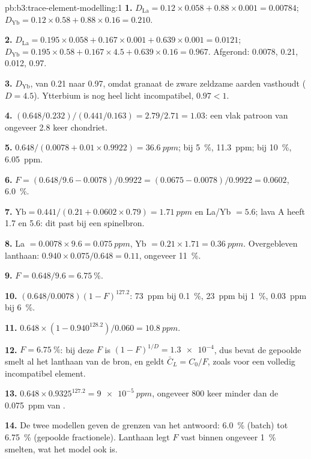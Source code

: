 \begin{solution}{pb:b3:trace-element-modelling:1}
\textbf{1.} $D_{\mathrm{La}} = 0.12\times0.058 + 0.88\times0.001 = 0.00784$;
$D_{\mathrm{Yb}} = 0.12\times0.58 + 0.88\times0.16 = 0.210$.

\textbf{2.} $D_{\mathrm{La}} = 0.195\times0.058 + 0.167\times0.001 +
0.639\times0.001 = 0.0121$; $D_{\mathrm{Yb}} = 0.195\times0.58 +
0.167\times4.5 + 0.639\times0.16 = 0.967$. Afgerond: 0.0078, 0.21, 0.012, 0.97.

\textbf{3.} $D_{\mathrm{Yb}}$, van 0.21 naar 0.97, omdat granaat de zware
zeldzame aarden vasthoudt ($D = 4.5$). Ytterbium is nog heel licht incompatibel,
$0.97 < 1$.

\textbf{4.} $(0.648/0.232)/(0.441/0.163) = 2.79/2.71 = 1.03$: een vlak patroon
van ongeveer 2.8 keer chondriet.

\textbf{5.} $0.648/(0.0078 + 0.01\times0.9922) = \qty{36.6}{ppm}$; bij
\qty{5}{\percent}, \qty{11.3}{ppm}; bij \qty{10}{\percent}, \qty{6.05}{ppm}.

\textbf{6.} $F = (0.648/9.6 - 0.0078)/0.9922 = (0.0675 - 0.0078)/0.9922 =
0.0602$, \qty{6.0}{\percent}.

\textbf{7.} $\mathrm{Yb} = 0.441/(0.21 + 0.0602\times0.79) = \qty{1.71}{ppm}$
en La/Yb $= 5.6$; lava A heeft 1.7 en 5.6: dit past bij een spinelbron.

\textbf{8.} La $= 0.0078\times9.6 = \qty{0.075}{ppm}$, Yb $= 0.21\times1.71 =
\qty{0.36}{ppm}$. Overgebleven lanthaan: $0.940\times0.075/0.648 = 0.11$, ongeveer
\qty{11}{\percent}.

\textbf{9.} $F = 0.648/9.6 = \qty{6.75}{\percent}$.

\textbf{10.} $(0.648/0.0078)(1 - F)^{127.2}$: \qty{73}{ppm} bij
\qty{0.1}{\percent}, \qty{23}{ppm} bij \qty{1}{\percent}, \qty{0.03}{ppm} bij
\qty{6}{\percent}.

\textbf{11.} $0.648\times(1 - 0.940^{128.2})/0.060 = \qty{10.8}{ppm}$.

\textbf{12.} $F = \qty{6.75}{\percent}$: bij deze $F$ is $(1 - F)^{1/D} =
\num{1.3e-4}$, dus bevat de gepoolde smelt al het lanthaan van de bron, en
geldt $\bar C_L = C_0/F$, zoals voor een volledig incompatibel element.

\textbf{13.} $0.648\times0.9325^{127.2} = \qty{9e-5}{ppm}$, ongeveer 800 keer
minder dan de \qty{0.075}{ppm} van .

\textbf{14.} De twee modellen geven de grenzen van het antwoord: \qty{6.0}{\percent} (batch)
tot \qty{6.75}{\percent} (gepoolde fractionele). Lanthaan legt $F$ vast binnen
ongeveer \qty{1}{\percent} smelten, wat het model ook is.


\end{solution}
